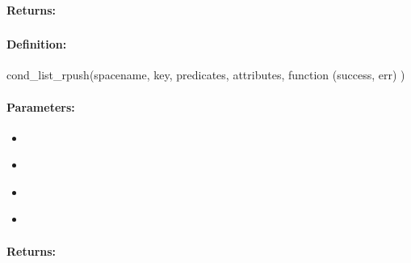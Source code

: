 \paragraph{Returns:}


\pagebreak
\subsubsection{}
\label{api:nodejs:cond_list_rpush}


\paragraph{Definition:}
\begin{javascriptcode}
cond_list_rpush(spacename, key, predicates, attributes, function (success, err) {})
\end{javascriptcode}
\paragraph{Parameters:}
\begin{itemize}[noitemsep]
\item {}\\

\item {}\\

\item {}\\

\item {}\\

\end{itemize}

\paragraph{Returns:}


\pagebreak
\subsubsection{}
\label{api:nodejs:set_add}


